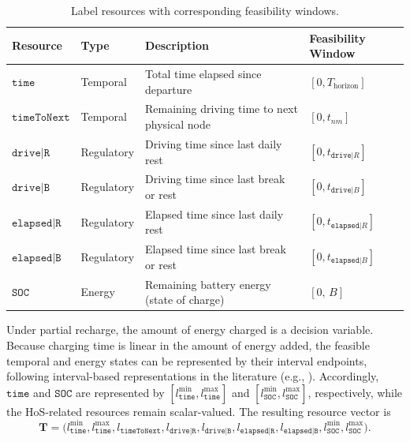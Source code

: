 \documentclass[3p,11pt,authoryear]{elsarticle}  %
\begin{document}
\begin{table}[!htbp]
\centering
\caption{Label resources with corresponding feasibility windows.}
\label{tab:resource_windows_partial}
\begin{tabular}{@{}llll@{}}
\toprule
\textbf{Resource} & \textbf{Type} & \textbf{Description} & \textbf{Feasibility Window} \\
\midrule
$\texttt{time}$ & Temporal & Total time elapsed since departure & $[0,T_{\text{horizon}}]$ \\
$\texttt{timeToNext}$ & Temporal &  Remaining driving time to next physical node & $[0,t_{nm}]$ \\
$\texttt{drive|R}$ & Regulatory & Driving time since last daily rest & $[0,t_{\texttt{drive}|R}]$ \\
$\texttt{drive|B}$ & Regulatory & Driving time since last break or rest & $[0,t_{\texttt{drive}|B}]$ \\
$\texttt{elapsed|R}$ & Regulatory & Elapsed time since last daily rest & $[0,t_{\texttt{elapsed}|R}]$ \\
$\texttt{elapsed|B}$ &  Regulatory & Elapsed time since last break or rest & $[0,t_{\texttt{elapsed}|B}]$ \\
$\texttt{SOC}$ & Energy & Remaining battery energy (state of charge)
  & $[0,\,B]$ \\
\bottomrule
\end{tabular}
\end{table}

Under partial recharge, the amount of energy charged is a decision variable. Because charging time is linear in the amount of energy added, the feasible temporal and energy states can be represented by their interval endpoints, following interval-based representations in the literature (e.g., \citet{desaulniers2016exact}). Accordingly, \(\texttt{time}\) and \(\texttt{SOC}\) are represented by
\([l_{\texttt{time}}^{\min},l_{\texttt{time}}^{\max}]\) and
\([l_{\texttt{SOC}}^{\min},l_{\texttt{SOC}}^{\max}]\), respectively, while the HoS-related resources remain scalar-valued. The resulting resource vector is
\[
\mathbf{T}=
\bigl(
l_{\texttt{time}}^{\min},
l_{\texttt{time}}^{\max},
l_{\texttt{timeToNext}},
l_{\texttt{drive|R}},
l_{\texttt{drive|B}},
l_{\texttt{elapsed|R}},
l_{\texttt{elapsed|B}},
l_{\texttt{SOC}}^{\min},
l_{\texttt{SOC}}^{\max}
\bigr).
\]


\end{document}
